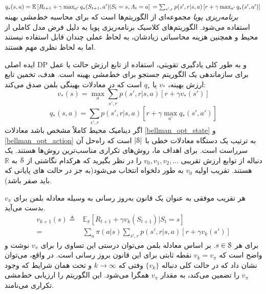 $q_*(s,a) = \mathbb{E}\left[R_{t+1} + \gamma \max_{a'} q_*(S_{t+1},a')| S_t=s, A_t=a \right] \\
= \sum_{s',r} p(s',r|s,a) \left[r + \gamma \max_{a'} q_*(s',a')\right] \\
$
\textit{برنامه‌ریزی پویا}   مجموعه‌ای از الگوریتم‌ها است که برای محاسبه خط‌مشی بهینه استفاده می‌شود.
الگوریتم‌های کلاسیک برنامه‌ریزی پویا به دلیل فرض
مدل کاملی از محیط و همچنین هزینه محاسباتی زیادشان، به لحاظ عملی چندان قابل استفاده نیستند اما به لحاظ نظری مهم هستند.

ایده اصلی DP و به طور کلی یادگیری تقویتی‌، استفاده از تابع ارزش حالت یا عمل برای سازماندهی یک الگوریتم جستجو برای خط‌مشی بهینه است.
هدف، تخمین تابع ارزش بهینه،
$v_*$
یا
$q_*$
است
که در معادلات بهینگی بلمن صدق می‌کند:
\begin{equation}
v_{*}(s) = \max_{a} \sum_{s',r} p(s',r | s,a)[r + \gamma v_*(s')]
\label{bellman_opt_state}
\end{equation}
\begin{equation}
q_{*}(s,a) = \sum_{s',r} p(s',r | s,a)[r + \gamma \max_{a'} q_* (s',a')]
\label{bellman_opt_action}
\end{equation}
اگر دینامیک محیط کاملاً مشخص باشد معادلات 
\ref{bellman_opt_state}
و
\ref{bellman_opt_action}
به ترتیب یک دستگاه معادلات خطی با
 $|\EuScript{S}|$
  است
 که راه‌حل آن سرراست است.
 برای اهداف ما، روش‌های تکراری مناسب‌ترین روش‌ها هستند. یک دنباله 
از توابع ارزش تقریبی
$ v_0 , v_1 , v_2 , ...$ 
را در نظر بگیرید که هرکدام نگاشتی از
$\EuScript{S}$ 
به 
$\mathbb{R}$
 هستند.
تقریب اولیه $v_0$
به طور دلخواه انتخاب می‌شود(به جز در حالت های پایانی که باید صفر باشد).

 هر تقریب موفقی به عنوان یک قانون به‌روز رسانی به وسیله معادله بلمن برای
$v_\pi$
بدست می‌آید. 
\begin{align}
v_{k+1}(s) \triangleq & \mathbb{E}_{\pi} [R_{t+1} + \gamma v_k(S_{t+1}) | S_t=s]  \nonumber \\
=& \sum_{a} \pi(a|s) \sum_{s',r} p(s',r | s,a)[r + \gamma v_k(s')]
\end{align}
 برای هر 
 $s \in \EuScript{S}$.
 بر اساس معادله بلمن می‌توان درستی این تساوی را برای 
$v_{\pi}$
نوشت و واضح است که 
 $v_k = v_{\pi}$
 نقطه ثابتی برای این قانون بروز رسانی است.
 در واقع، می‌توان نشان داد که در حالت کلی دنباله 
 $\{ v_k \}$
وفتی که 
$ k \rightarrow \infty $
و تحت همان شرایط که وجود 
$v_{\pi}$
را تضمین می‌کند، به مقدار 
$v_{\pi}$
همگرا می‌شود.  این الگوریتم را ارزیابی خط‌مشی تکراری
 می‌نامند.
 
